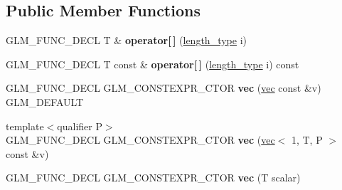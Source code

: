 \subsection*{Public Member Functions}
\begin{DoxyCompactItemize}
\item 
\mbox{\label{structglm_1_1vec_3_011_00_01T_00_01Q_01_4_a3ddc7f24ef7c4820534a14043fb51946}} 
G\+L\+M\+\_\+\+F\+U\+N\+C\+\_\+\+D\+E\+CL T \& {\bfseries operator\mbox{[}$\,$\mbox{]}} (\hyperlink{structglm_1_1vec_3_011_00_01T_00_01Q_01_4_a37415eee3b59cf93cdb752a2b30fe5e6}{length\+\_\+type} i)
\item 
\mbox{\label{structglm_1_1vec_3_011_00_01T_00_01Q_01_4_aca63447e88983b17ea1cb8698f9f8018}} 
G\+L\+M\+\_\+\+F\+U\+N\+C\+\_\+\+D\+E\+CL T const  \& {\bfseries operator\mbox{[}$\,$\mbox{]}} (\hyperlink{structglm_1_1vec_3_011_00_01T_00_01Q_01_4_a37415eee3b59cf93cdb752a2b30fe5e6}{length\+\_\+type} i) const
\item 
\mbox{\label{structglm_1_1vec_3_011_00_01T_00_01Q_01_4_ac61412a4328fca49ded68a788eee5385}} 
G\+L\+M\+\_\+\+F\+U\+N\+C\+\_\+\+D\+E\+CL G\+L\+M\+\_\+\+C\+O\+N\+S\+T\+E\+X\+P\+R\+\_\+\+C\+T\+OR {\bfseries vec} (\hyperlink{structglm_1_1vec}{vec} const \&v) G\+L\+M\+\_\+\+D\+E\+F\+A\+U\+LT
\item 
\mbox{\label{structglm_1_1vec_3_011_00_01T_00_01Q_01_4_a335f0b237f2efd588837a62b9a8e7306}} 
{\footnotesize template$<$qualifier P$>$ }\\G\+L\+M\+\_\+\+F\+U\+N\+C\+\_\+\+D\+E\+CL G\+L\+M\+\_\+\+C\+O\+N\+S\+T\+E\+X\+P\+R\+\_\+\+C\+T\+OR {\bfseries vec} (\hyperlink{structglm_1_1vec}{vec}$<$ 1, T, P $>$ const \&v)
\item 
\mbox{\label{structglm_1_1vec_3_011_00_01T_00_01Q_01_4_a37e46740c8de9a5cf779508b05114859}} 
G\+L\+M\+\_\+\+F\+U\+N\+C\+\_\+\+D\+E\+CL G\+L\+M\+\_\+\+C\+O\+N\+S\+T\+E\+X\+P\+R\+\_\+\+C\+T\+OR {\bfseries vec} (T scalar)
\item 
\mbox{\label{structglm_1_1vec_3_011_00_01T_00_01Q_01_4_a48714830341cbda646b425d42ae72314}} 

\end{DoxyCompactItemize}
